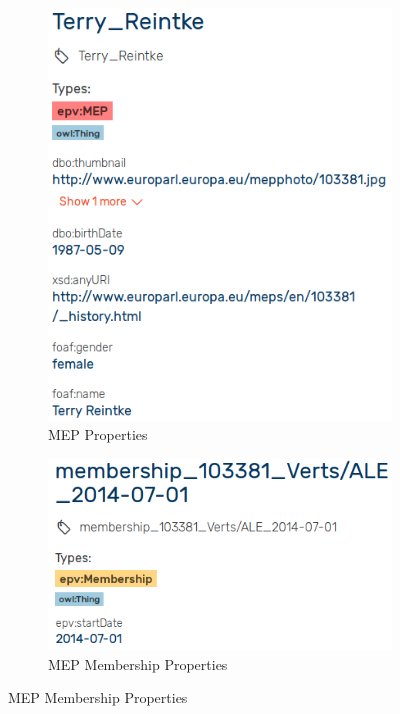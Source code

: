 \documentclass{article}
\begin{document}
\begin{figure}
\begin{subfigure}{.5\textwidth}
  \centering
  \includegraphics[width=.8\linewidth]{images/mep.png}
  \caption{MEP Properties}
  \label{fig:propertiesMEP}
\end{subfigure}%
\begin{subfigure}{.5\textwidth}
  \centering
  \includegraphics[width=.8\linewidth]{images/membership.png}
  \caption{MEP Membership Properties}
  \label{fig:propertiesMembership}
\end{subfigure}
\label{fig:fig}
\end{figure}
\end{document}
